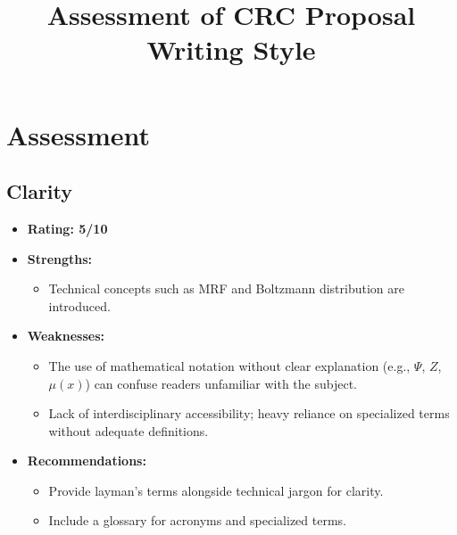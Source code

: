 \documentclass{article}
\title{Assessment of CRC Proposal Writing Style}
\author{}
\date{}
\begin{document}
\maketitle

\section{Assessment}

\subsection{Clarity}
\begin{itemize}
    \item \textbf{Rating: 5/10}
    \item \textbf{Strengths:}
    \begin{itemize}
        \item Technical concepts such as MRF and Boltzmann distribution are introduced.
    \end{itemize}
    \item \textbf{Weaknesses:}
    \begin{itemize}
        \item The use of mathematical notation without clear explanation (e.g., $\Psi$, $Z$, $\mu(x)$) can confuse readers unfamiliar with the subject.
        \item Lack of interdisciplinary accessibility; heavy reliance on specialized terms without adequate definitions.
    \end{itemize}
    \item \textbf{Recommendations:}
    \begin{itemize}
        \item Provide layman's terms alongside technical jargon for clarity.
        \item Include a glossary for acronyms and specialized terms.
    \end{itemize}
\end{itemize}
\end{document}
